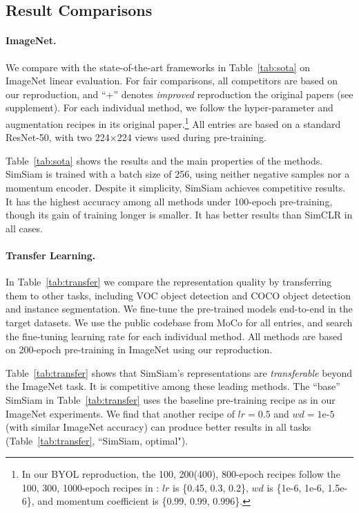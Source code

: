 \documentclass[final]{cvpr}
\newcommand{\appdx}{supplement}
\begin{document}
\subsection{Result Comparisons} \label{sec:results}

\paragraph{ImageNet.}
We compare with the state-of-the-art frameworks in Table~\ref{tab:sota} on ImageNet linear evaluation. For fair comparisons, all competitors are based on our reproduction, and ``+'' denotes \emph{improved} reproduction \vs the original papers (see \appdx).
For each individual method, we follow the hyper-parameter and augmentation recipes in its original paper.\footnote{In our BYOL reproduction, the 100, 200(400), 800-epoch recipes follow the 100, 300, 1000-epoch recipes in \cite{Grill2020}: $lr$ is \{0.45, 0.3, 0.2\}, $wd$ is \{1e-6, 1e-6, 1.5e-6\}, and momentum coefficient is \{0.99, 0.99, 0.996\}.}
All entries are based on a standard ResNet-50, with two 224$\times$224 views used during pre-training.


Table~\ref{tab:sota} shows the results and the main properties of the methods.
SimSiam is trained with a batch size of 256, using neither negative samples nor a momentum encoder.
Despite it simplicity, SimSiam achieves competitive results.
It has the highest accuracy among all methods under 100-epoch pre-training, though its gain of training longer is smaller. 
It has better results than SimCLR in all cases.

\paragraph{Transfer Learning.} In Table~\ref{tab:transfer} we compare the representation quality by transferring them to other tasks, including VOC \cite{Everingham2010} object detection and COCO \cite{Lin2014} object detection and instance segmentation.
 We fine-tune the pre-trained models end-to-end in the target datasets. We use the public codebase from MoCo \cite{He2019a} for all entries, and search the fine-tuning learning rate for each individual method.
All methods are based on 200-epoch pre-training in ImageNet using our reproduction.

Table~\ref{tab:transfer} shows that SimSiam's representations are \emph{transferable} beyond the ImageNet task.
It is competitive among these leading methods. The ``base'' SimSiam in Table~\ref{tab:transfer} uses the baseline pre-training recipe as in our ImageNet experiments. We find that another recipe of $lr\!=\!\text{0.5}$ and $wd\!=\!\text{1e-5}$ (with similar ImageNet accuracy) can produce better results in all tasks (Table~\ref{tab:transfer}, ``SimSiam, optimal").
\end{document}
